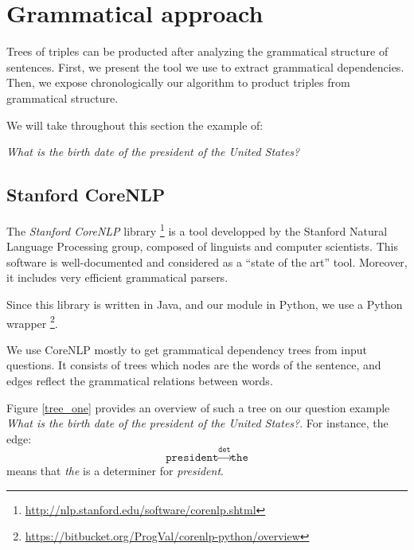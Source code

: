\section{Grammatical approach}

Trees of triples can be producted after analyzing the grammatical structure of sentences. First, we  present the tool we use to extract grammatical dependencies. Then, we expose chronologically our algorithm to product triples from grammatical structure.

We will take throughout this section the example of:
\begin{center}
 \textit{What is the birth date of the president of the United States?}
\end{center}


\subsection{Stanford CoreNLP}

The \emph{Stanford CoreNLP} library \footnote{\url{http://nlp.stanford.edu/software/corenlp.shtml}} is a tool developped by the Stanford Natural Language Processing group, composed of linguists and computer scientists. This software is well-documented and considered as a ``state of the art'' tool. Moreover, it includes very efficient grammatical parsers.

Since this library is written in Java, and our module in Python, we use a Python wrapper \footnote{\url{https://bitbucket.org/ProgVal/corenlp-python/overview}}.

We use CoreNLP mostly to get grammatical dependency trees from input questions. It consists of trees which nodes are the words of the sentence, and edges reflect the grammatical relations between words.

Figure \ref{tree_one} provides an overview of such a tree on our question example \emph{What is the birth date of the president of the United States?}. For instance, the edge:
  \[\texttt{president}\xrightarrow{\texttt{det}}\texttt{the}\]
means that \emph{the} is a determiner for \emph{president}.

